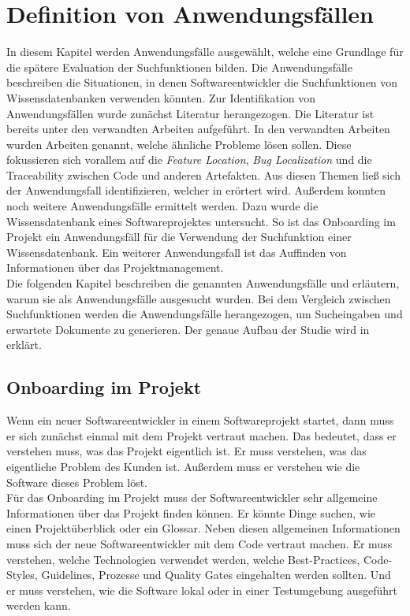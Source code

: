 \chapter{Definition von Anwendungsfällen}
\label{chap:anwendungsfaelle}
In diesem Kapitel werden Anwendungsfälle ausgewählt, welche eine Grundlage für die spätere Evaluation der Suchfunktionen bilden.
Die Anwendungsfälle beschreiben die Situationen, in denen Softwareentwickler die Suchfunktionen von Wissensdatenbanken verwenden könnten.
Zur Identifikation von Anwendungsfällen wurde zunächst Literatur herangezogen.
Die Literatur ist bereits unter den verwandten Arbeiten aufgeführt.
In den verwandten Arbeiten wurden Arbeiten genannt, welche ähnliche Probleme lösen sollen.
Diese fokussieren sich vorallem auf die \textit{Feature Location}, \textit{Bug Localization} und die Traceability zwischen Code und anderen Artefakten.
Aus diesen Themen ließ sich der Anwendungsfall identifizieren, welcher in  erörtert wird.
Außerdem konnten noch weitere Anwendungsfälle ermittelt werden.
Dazu wurde die Wissensdatenbank eines Softwareprojektes untersucht.
So ist das Onboarding im Projekt ein Anwendungsfäll für die Verwendung der Suchfunktion einer Wissensdatenbank.
Ein weiterer Anwendungsfall ist das Auffinden von Informationen über das Projektmanagement.\\

Die folgenden Kapitel beschreiben die genannten Anwendungsfälle und erläutern, warum sie als Anwendungsfälle ausgesucht wurden.
Bei dem Vergleich zwischen Suchfunktionen werden die Anwendungsfälle herangezogen, um Sucheingaben und erwartete Dokumente zu generieren.
Der genaue Aufbau der Studie wird in  erklärt.

\section{Onboarding im Projekt}
Wenn ein neuer Softwareentwickler in einem Softwareprojekt startet, dann muss er sich zunächst einmal mit dem Projekt vertraut machen.
Das bedeutet, dass er verstehen muss, was das Projekt eigentlich ist.
Er muss verstehen, was das eigentliche Problem des Kunden ist.
Außerdem muss er verstehen wie die Software dieses Problem löst.\\

Für das Onboarding im Projekt muss der Softwareentwickler sehr allgemeine Informationen über das Projekt finden können.
Er könnte Dinge suchen, wie einen Projektüberblick oder ein Glossar.
Neben diesen allgemeinen Informationen muss sich der neue Softwareentwickler mit dem Code vertraut machen.
Er muss verstehen, welche Technologien verwendet werden, welche Best-Practices, Code-Styles, Guidelines, Prozesse und Quality Gates eingehalten werden sollten.
Und er muss verstehen, wie die Software lokal oder in einer Testumgebung ausgeführt werden kann.\\

